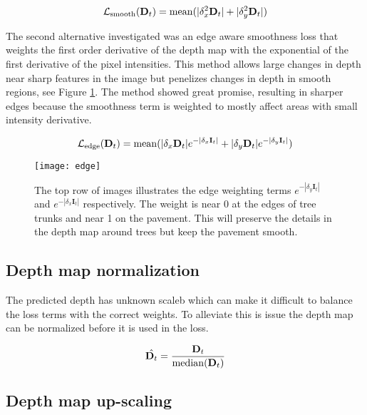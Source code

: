 \begin{equation}
\mathcal{L}_{\mathrm{smooth}}(\textbf{D}_t)=\operatorname{mean}(|\delta_x^2 \textbf{D}_t|+|\delta_y^2 \textbf{D}_t|)
\end{equation}

The second alternative investigated was an edge aware smoothness loss that weights the first order derivative of the depth map with the exponential of the first derivative of the pixel intensities. This method allows large changes in depth near sharp features in the image but penelizes changes in depth in smooth regions, see Figure \ref{fig:edge}. The method showed great promise, resulting in sharper edges because the smoothness term is weighted to mostly affect areas with small intensity derivative.

\begin{equation}
\mathcal{L}_{\mathrm{edge}}(\textbf{D}_t)=\operatorname{mean}(|\delta_x \textbf{D}_t|e^{-|\delta_x \textbf{I}_t|} + |\delta_y \textbf{D}_t|e^{-|\delta_y \textbf{I}_t|})
\end{equation}

\begin{figure}[H]
	\centering
	\texttt{[image: edge]}
	\caption{The top row of images illustrates the edge weighting terms $e^{-|\delta_y \textbf{I}_t|}$ and $e^{-|\delta_x \textbf{I}_t|}$ respectively. The weight is near 0 at the edges of tree trunks and near 1 on the pavement. This will preserve the details in the depth map around trees but keep the pavement smooth.}
	\label{fig:edge}
\end{figure}

\subsection{Depth map normalization}\label{sec:normalization}

The predicted depth has unknown scaleb which can make it difficult to balance the loss terms with the correct weights. To alleviate this is issue the depth map can be normalized before it is used in the loss.

\begin{equation}
\hat{\textbf{D}_t} = \frac{\textbf{D}_t}{\operatorname{median}(\textbf{D}_t)} 
\end{equation}

\subsection{Depth map up-scaling}\label{sec:upscale}

